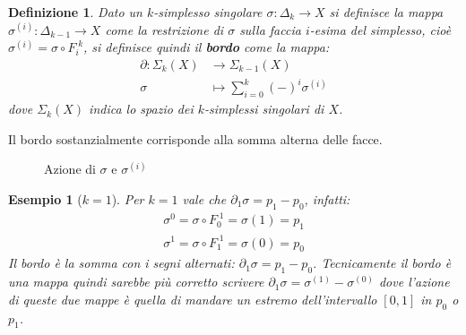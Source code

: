 \documentclass[10pt, twoside=false, x11names]{scrbook}
\newtheorem{definition}[theorem]{Definizione}
\newtheorem{example}[theorem]{Esempio}
\begin{document}
\begin{definition}
  Dato un $ k $-simplesso singolare $ \sigma: \Delta_k \to X $ si definisce la mappa $ \sigma^{(i)} \colon \Delta_{k-1} \to X $ come la restrizione
  di $ \sigma $ sulla faccia $ i $-esima del simplesso, cioè $ \sigma^{(i)} = \sigma \circ F_i^{\; k} $,
  si definisce quindi il \textbf{bordo} come la mappa:
  \begin{align*}
    \partial \colon \Sigma_k(X) & \to \Sigma_{k-1}(X) \\
    \sigma & \mapsto  \sum_{i=0}^{k}(-)^i \sigma^{(i)}
  \end{align*}
  dove $ \Sigma_k(X) $ indica lo spazio dei $ k $-simplessi singolari di $ X $.
\end{definition}
Il bordo sostanzialmente corrisponde alla somma alterna delle facce.

\begin{figure}[htbp]
  \centering
  \caption{Azione di $ \sigma $ e $ \sigma^{(i)} $}
  \label{fig:lez1:sigma}
\end{figure}

\begin{example}[$ k = 1 $]
  Per $ k = 1 $ vale che $ \partial_1 \sigma = p_1 - p_0 $, infatti:
  \begin{align*}
    \sigma^{0} = \sigma \circ F_0^{\; 1} = \sigma(1) = p_1 \\
    \sigma^{1} = \sigma \circ F_1^{\; 1} = \sigma(0) = p_0
  \end{align*}
  Il bordo è la somma con i segni alternati: $ \partial_1 \sigma = p_1 - p_0 $. Tecnicamente il bordo è una mappa
  quindi sarebbe più corretto scrivere $ \partial_1 \sigma = \sigma^{(1)} - \sigma^{(0)} $ dove l'azione di queste due mappe è
  quella di mandare un estremo dell'intervallo $ [0,1] $ in $ p_0 $ o $ p_1 $.
\end{example}
\end{document}
